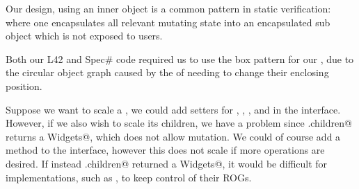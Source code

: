 Our design, using an inner \Q@Box@ object is a common pattern in static verification: where one encapsulates all relevant mutating state into an encapsulated sub object which is not exposed to users.

Both our L42 and Spec\# code required us to use the box pattern for our \Q@SafeMovable@, due to the circular object graph caused by the \Q@Action@s of \Q@Button@s needing to change their enclosing \Q@SafeMovable@ position.

Suppose we want to scale a \Q@Widget@, we could add \Q@mut@ setters for \Q@width@, \Q@height@, \Q@left@, and \Q@top@ in the \Q@Widget@ interface. However, if we also wish to scale its children, we have a problem since \Q@Widget.children@ returns a \Q@read Widgets@, which does not allow mutation. We could of course add a \Q@mut@ method \Q@zoom@ to the \Q@Widget@ interface, however this does not scale if more operations are desired. If instead \Q@Widget.children@ returned a \Q@mut Widgets@, it would be difficult for \Q@Widget@ implementations, such as \Q@SafeMovable@, to keep control of their ROGs.




